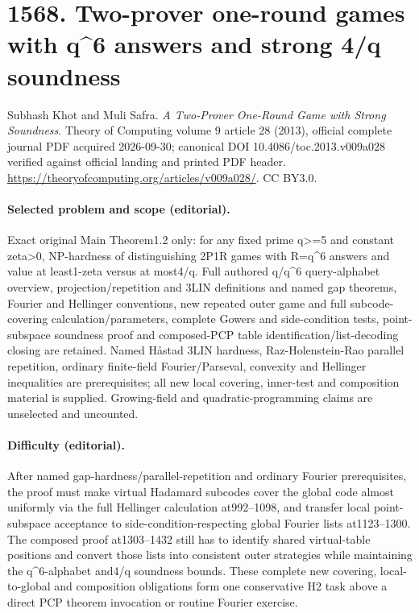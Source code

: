\documentclass[10pt]{article}
\theoremstyle{definition}
\numberwithin{equation}{section}
\begin{document}
\begingroup\raggedright
\section*{1568. Two-prover one-round games with q\textasciicircum{}6 answers and strong 4/q soundness}
Subhash Khot and Muli Safra. \emph{A Two-Prover One-Round Game with Strong Soundness}. Theory of Computing volume 9 article 28 (2013), official complete journal PDF acquired 2026-09-30; canonical DOI 10.4086/toc.2013.v009a028 verified against official landing and printed PDF header. \url{https://theoryofcomputing.org/articles/v009a028/}. CC BY3.0.
\paragraph{Selected problem and scope (editorial).} Exact original Main Theorem1.2 only: for any fixed prime q>=5 and constant zeta>0, NP-hardness of distinguishing 2P1R games with R=q\textasciicircum{}6 answers and value at least1-zeta versus at most4/q. Full authored q/q\textasciicircum{}6 query-alphabet overview, projection/repetition and 3LIN definitions and named gap theorems, Fourier and Hellinger conventions, new repeated outer game and full subcode-covering calculation/parameters, complete Gowers and side-condition tests, point-subspace soundness proof and composed-PCP table identification/list-decoding closing are retained. Named Håstad 3LIN hardness, Raz-Holenstein-Rao parallel repetition, ordinary finite-field Fourier/Parseval, convexity and Hellinger inequalities are prerequisites; all new local covering, inner-test and composition material is supplied. Growing-field and quadratic-programming claims are unselected and uncounted.
\paragraph{Difficulty (editorial).} After named gap-hardness/parallel-repetition and ordinary Fourier prerequisites, the proof must make virtual Hadamard subcodes cover the global code almost uniformly via the full Hellinger calculation at992–1098, and transfer local point-subspace acceptance to side-condition-respecting global Fourier lists at1123–1300. The composed proof at1303–1432 still has to identify shared virtual-table positions and convert those lists into consistent outer strategies while maintaining the q\textasciicircum{}6-alphabet and4/q soundness bounds. These complete new covering, local-to-global and composition obligations form one conservative H2 task above a direct PCP theorem invocation or routine Fourier exercise.
\end{document}
